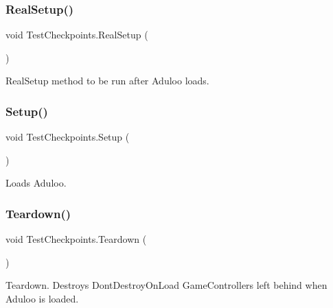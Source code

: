 \subsubsection{\texorpdfstring{Real\+Setup()}{RealSetup()}}
{\footnotesize\ttfamily void Test\+Checkpoints.\+Real\+Setup (\begin{DoxyParamCaption}{ }\end{DoxyParamCaption})}



Real\+Setup method to be run after Aduloo loads. 

\mbox{\label{class_test_checkpoints_a0289aed3d7797a957e8d2b1d076e4747}} 
\subsubsection{\texorpdfstring{Setup()}{Setup()}}
{\footnotesize\ttfamily void Test\+Checkpoints.\+Setup (\begin{DoxyParamCaption}{ }\end{DoxyParamCaption})}



Loads Aduloo. 

\mbox{\label{class_test_checkpoints_a951c529270c526ccbcb75e0dd66f3625}} 
\subsubsection{\texorpdfstring{Teardown()}{Teardown()}}
{\footnotesize\ttfamily void Test\+Checkpoints.\+Teardown (\begin{DoxyParamCaption}{ }\end{DoxyParamCaption})}



Teardown. Destroys Dont\+Destroy\+On\+Load Game\+Controllers left behind when Aduloo is loaded. 

\mbox{\label{class_test_checkpoints_ab5b10117fcbbd425531ee9dc7bc37bfd}} 
